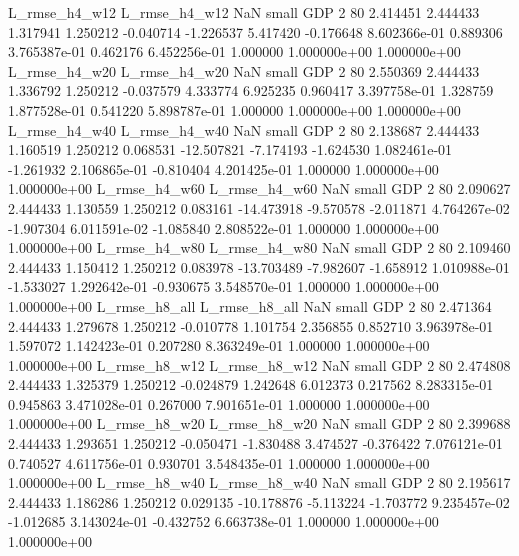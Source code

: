  L_rmse_h4_w12  L_rmse_h4_w12                   NaN      small      GDP                 2 80 2.414451       2.444433 1.317941       1.250212   -0.040714     -1.226537      5.417420    -0.176648   8.602366e-01  0.889306 3.765387e-01     0.462176   6.452256e-01            1.000000    1.000000e+00        1.000000e+00
 L_rmse_h4_w20  L_rmse_h4_w20                   NaN      small      GDP                 2 80 2.550369       2.444433 1.336792       1.250212   -0.037579      4.333774      6.925235     0.960417   3.397758e-01  1.328759 1.877528e-01     0.541220   5.898787e-01            1.000000    1.000000e+00        1.000000e+00
 L_rmse_h4_w40  L_rmse_h4_w40                   NaN      small      GDP                 2 80 2.138687       2.444433 1.160519       1.250212    0.068531    -12.507821     -7.174193    -1.624530   1.082461e-01 -1.261932 2.106865e-01    -0.810404   4.201425e-01            1.000000    1.000000e+00        1.000000e+00
 L_rmse_h4_w60  L_rmse_h4_w60                   NaN      small      GDP                 2 80 2.090627       2.444433 1.130559       1.250212    0.083161    -14.473918     -9.570578    -2.011871   4.764267e-02 -1.907304 6.011591e-02    -1.085840   2.808522e-01            1.000000    1.000000e+00        1.000000e+00
 L_rmse_h4_w80  L_rmse_h4_w80                   NaN      small      GDP                 2 80 2.109460       2.444433 1.150412       1.250212    0.083978    -13.703489     -7.982607    -1.658912   1.010988e-01 -1.533027 1.292642e-01    -0.930675   3.548570e-01            1.000000    1.000000e+00        1.000000e+00
 L_rmse_h8_all  L_rmse_h8_all                   NaN      small      GDP                 2 80 2.471364       2.444433 1.279678       1.250212   -0.010778      1.101754      2.356855     0.852710   3.963978e-01  1.597072 1.142423e-01     0.207280   8.363249e-01            1.000000    1.000000e+00        1.000000e+00
 L_rmse_h8_w12  L_rmse_h8_w12                   NaN      small      GDP                 2 80 2.474808       2.444433 1.325379       1.250212   -0.024879      1.242648      6.012373     0.217562   8.283315e-01  0.945863 3.471028e-01     0.267000   7.901651e-01            1.000000    1.000000e+00        1.000000e+00
 L_rmse_h8_w20  L_rmse_h8_w20                   NaN      small      GDP                 2 80 2.399688       2.444433 1.293651       1.250212   -0.050471     -1.830488      3.474527    -0.376422   7.076121e-01  0.740527 4.611756e-01     0.930701   3.548435e-01            1.000000    1.000000e+00        1.000000e+00
 L_rmse_h8_w40  L_rmse_h8_w40                   NaN      small      GDP                 2 80 2.195617       2.444433 1.186286       1.250212    0.029135    -10.178876     -5.113224    -1.703772   9.235457e-02 -1.012685 3.143024e-01    -0.432752   6.663738e-01            1.000000    1.000000e+00        1.000000e+00
